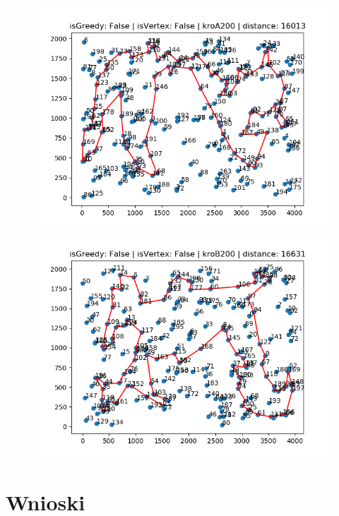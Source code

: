 \documentclass{article}
\begin{document}
\begin{figure}[h!]
    \centering
  \begin{minipage}[b]{0.8\textwidth}
    \includegraphics[width=\textwidth]{random_kroA200_V-False_G-False.png}
  \end{minipage}

  \begin{minipage}[b]{0.8\textwidth}
    \includegraphics[width=\textwidth]{random_kroB200_V-False_G-False.png}
  \end{minipage}
\end{figure}


\section{Wnioski}
\end{document}
